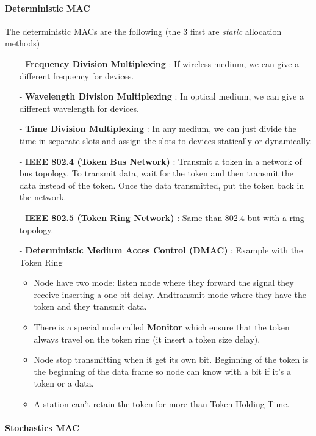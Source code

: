 \paragraph{\textbf{Deterministic MAC}}
The deterministic MACs are the following (the 3 first are \emph{static} allocation methods)
\begin{itemize}
    \item[-] \textbf{Frequency Division Multiplexing} :
    If wireless medium, we can give a different frequency for devices.
  \item[-] \textbf{Wavelength Division Multiplexing} :
    In optical medium, we can give a different wavelength for devices.
  \item[-] \textbf{Time Division Multiplexing} :
    In any medium, we can just divide the time in separate slots and assign the slots to devices
    statically or dynamically.
  \item[-] \textbf{IEEE 802.4 (Token Bus Network)} :
    Transmit a token in a network of bus topology.
    To transmit data, wait for the token and then transmit the data instead of the token.
    Once the data transmitted, put the token back in the network.
  \item[-] \textbf{IEEE 802.5 (Token Ring Network)} :
    Same than 802.4 but with a ring topology. 

	\item[-] \textbf{Deterministic Medium Acces Control (DMAC) } : Example with the Token Ring 
	\begin{itemize}
		\item Node have two mode: listen mode where they forward the  signal they receive inserting a one bit delay. Andtransmit mode where they have the token and they  transmit data. 
		\item There is a special node called \textbf{Monitor} which ensure that the token always travel on the token ring (it insert a token size delay). 
		\item Node stop transmitting when it get its own bit. Beginning of the token is the beginning of the data frame so node can know with a bit if it's a token or a data.
		\item A station can't retain the token for more than Token Holding Time.
    \end{itemize}
\end{itemize}

\paragraph{\textbf{Stochastics MAC}}


